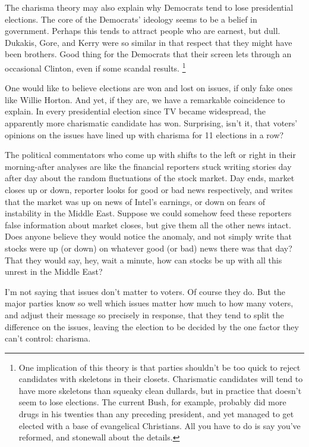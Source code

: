 The charisma theory may also explain why Democrats tend to lose
presidential elections. The core of the Democrats' ideology seems to be
a belief in government. Perhaps this tends to attract people who are
earnest, but dull. Dukakis, Gore, and Kerry were so similar in that
respect that they might have been brothers. Good thing for the Democrats
that their screen lets through an occasional Clinton, even if some
scandal results. \footnote{One implication of this theory is that parties shouldn't be too
quick to reject candidates with skeletons in their closets. Charismatic
candidates will tend to have more skeletons than squeaky clean dullards,
but in practice that doesn't seem to lose elections. The current Bush,
for example, probably did more drugs in his twenties than any preceding
president, and yet managed to get elected with a base of evangelical
Christians. All you have to do is say you've reformed, and stonewall
about the details.}

One would like to believe elections are won and lost on issues, if only
fake ones like Willie Horton. And yet, if they are, we have a remarkable
coincidence to explain. In every presidential election since TV became
widespread, the apparently more charismatic candidate has won.
Surprising, isn't it, that voters' opinions on the issues have lined up
with charisma for 11 elections in a row?

The political commentators who come up with shifts to the left or right
in their morning-after analyses are like the financial reporters stuck
writing stories day after day about the random fluctuations of the stock
market. Day ends, market closes up or down, reporter looks for good or
bad news respectively, and writes that the market was up on news of
Intel's earnings, or down on fears of instability in the Middle East.
Suppose we could somehow feed these reporters false information about
market closes, but give them all the other news intact. Does anyone
believe they would notice the anomaly, and not simply write that stocks
were up (or down) on whatever good (or bad) news there was that day?
That they would say, hey, wait a minute, how can stocks be up with all
this unrest in the Middle East?

I'm not saying that issues don't matter to voters. Of course they do.
But the major parties know so well which issues matter how much to how
many voters, and adjust their message so precisely in response, that
they tend to split the difference on the issues, leaving the election to
be decided by the one factor they can't control: charisma.

